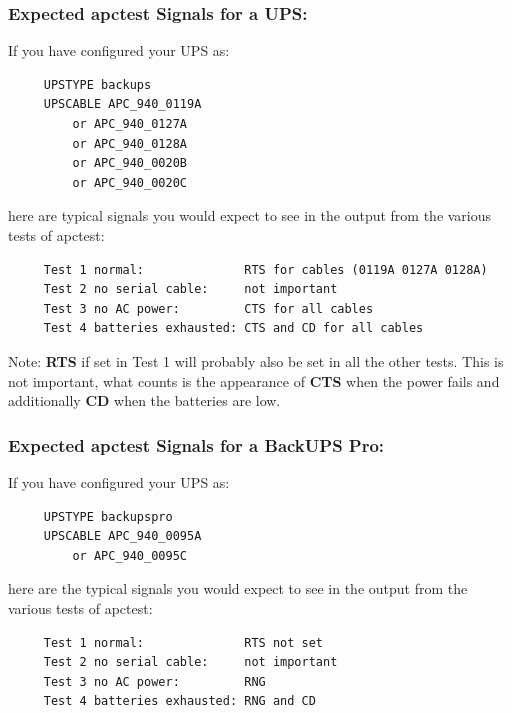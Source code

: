{{{{{{{\label{Expected-apctest-Signals-for-a-UPS}

\subsubsection*{Expected apctest Signals for a UPS:}

\label{index-Testing-224}
\label{index-apctest-225}
If you have configured your UPS as: 

\footnotesize
\begin{verbatim}
     UPSTYPE backups
     UPSCABLE APC_940_0119A
         or APC_940_0127A
         or APC_940_0128A
         or APC_940_0020B
         or APC_940_0020C
\end{verbatim}
\normalsize

here are typical signals you would expect to see in the output from the
various tests of apctest: 

\footnotesize
\begin{verbatim}
     Test 1 normal:              RTS for cables (0119A 0127A 0128A)
     Test 2 no serial cable:     not important
     Test 3 no AC power:         CTS for all cables
     Test 4 batteries exhausted: CTS and CD for all cables
\end{verbatim}
\normalsize

Note: {\bf RTS} if set in Test 1 will probably also be set in all the other
tests. This is not important, what counts is the appearance of {\bf CTS} when
the power fails and additionally {\bf CD} when the batteries are low. 

\label{Expected-apctest-Signals-for-a-BackUPS-Pro}

\subsubsection*{Expected apctest Signals for a BackUPS Pro:}

\label{index-Testing-226}
\label{index-apctest-227}
If you have configured your UPS as: 

\footnotesize
\begin{verbatim}
     UPSTYPE backupspro
     UPSCABLE APC_940_0095A
         or APC_940_0095C
\end{verbatim}
\normalsize

here are the typical signals you would expect to see in the output from the
various tests of apctest: 

\footnotesize
\begin{verbatim}
     Test 1 normal:              RTS not set
     Test 2 no serial cable:     not important
     Test 3 no AC power:         RNG
     Test 4 batteries exhausted: RNG and CD
\end{verbatim}
\normalsize

}}}}}}}
